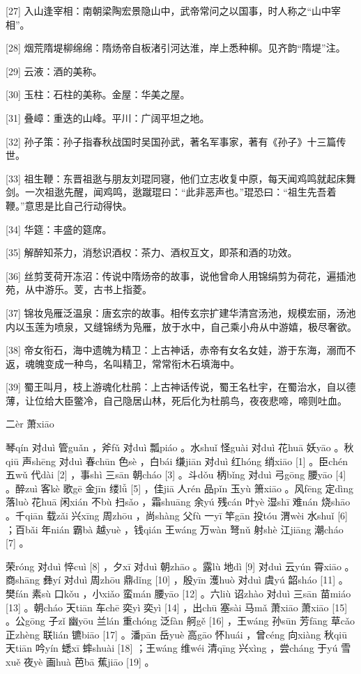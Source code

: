\documentclass[12pt,UTF8]{ctexbook}
\begin{document}
[27] 入山逢宰相：南朝梁陶宏景隐山中，武帝常问之以国事，时人称之“山中宰相”。

[28] 烟荒隋堤柳绵绵：隋炀帝自板渚引河达淮，岸上悉种柳。见齐韵“隋堤”注。

[29] 云液：酒的美称。

[30] 玉柱：石柱的美称。金屋：华美之屋。

[31] 叠嶂：重迭的山峰。平川：广阔平坦之地。

[32] 孙子策：孙子指春秋战国时吴国孙武，著名军事家，著有《孙子》十三篇传世。

[33] 祖生鞭：东晋祖逖与朋友刘琨同寝，他们立志收复中原，每天闻鸡鸣就起床舞剑。一次祖逖先醒，闻鸡鸣，逖蹴琨曰：“此非恶声也。”琨恐曰：“祖生先吾着鞭。”意思是比自己行动得快。

[34] 华筵：丰盛的筵席。

[35] 解醉知茶力，消愁识酒权：茶力、酒权互文，即茶和酒的功效。

[36] 丝剪芰荷开冻沼：传说中隋炀帝的故事，说他曾命人用锦绢剪为荷花，遍插池苑，从中游乐。芰，古书上指菱。

[37] 锦妆凫雁泛温泉：唐玄宗的故事。相传玄宗扩建华清宫汤池，规模宏丽，汤池内以玉莲为喷泉，又缝锦绣为凫雁，放于水中，自己乘小舟从中游嬉，极尽奢欲。

[38] 帝女衔石，海中遗魄为精卫：上古神话，赤帝有女名女娃，游于东海，溺而不返，魂魄变成一种鸟，名叫精卫，常常衔木石填海中。

[39] 蜀王叫月，枝上游魂化杜鹃：上古神话传说，蜀王名杜宇，在蜀治水，自以德薄，让位给大臣鳖冷，自己隐居山林，死后化为杜鹃鸟，夜夜悲啼，啼则吐血。





二èr 萧xiāo


琴qín 对duì 管guǎn ，斧fǔ 对duì 瓢piáo 。水shuǐ 怪guài 对duì 花huā 妖yāo 。秋qiū 声shēng 对duì 春chūn 色sè ，白bái 缣jiān 对duì 红hóng 绡xiāo [1] 。臣chén 五wǔ 代dài [2] ，事shì 三sān 朝cháo [3] 。斗dǒu 柄bǐng 对duì 弓gōng 腰yāo [4] 。醉zuì 客kè 歌gē 金jīn 缕lǚ [5] ，佳jiā 人rén 品pǐn 玉yù 箫xiāo 。风fēng 定dìng 落luò 花huā 闲xián 不bù 扫sǎo ，霜shuāng 余yú 残cán 叶yè 湿shī 难nán 烧shāo 。千qiān 载zǎi 兴xīng 周zhōu ，尚shàng 父fù 一yī 竿gān 投tóu 渭wèi 水shuǐ [6] ；百bǎi 年nián 霸bà 越yuè ，钱qián 王wáng 万wàn 弩nǔ 射shè 江jiāng 潮cháo [7] 。

荣róng 对duì 悴cuì [8] ，夕xī 对duì 朝zhāo 。露lù 地dì [9] 对duì 云yún 霄xiāo 。商shāng 彝yí 对duì 周zhōu 鼎dǐng [10] ，殷yīn 濩huò 对duì 虞yú 韶sháo [11] 。樊fán 素sù 口kǒu ，小xiǎo 蛮mán 腰yāo [12] 。六liù 诏zhào 对duì 三sān 苗miáo [13] 。朝cháo 天tiān 车chē 奕yì 奕yì [14] ，出chū 塞sài 马mǎ 萧xiāo 萧xiāo [15] 。公gōng 子zǐ 幽yōu 兰lán 重chóng 泛fàn 舸gě [16] ，王wáng 孙sūn 芳fāng 草cǎo 正zhèng 联lián 镳biāo [17] 。潘pān 岳yuè 高gāo 怀huái ，曾céng 向xiàng 秋qiū 天tiān 吟yín 蟋xī 蟀shuài [18] ；王wáng 维wéi 清qīng 兴xìng ，尝cháng 于yú 雪xuě 夜yè 画huà 芭bā 蕉jiāo [19] 。
\end{document}

